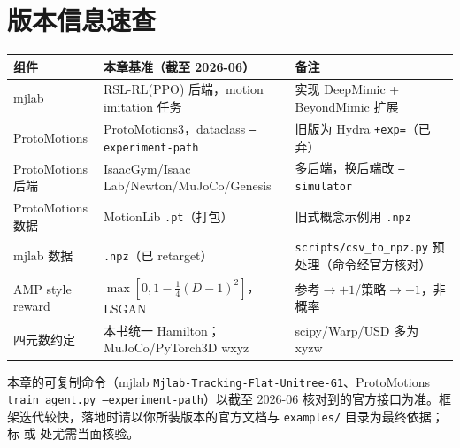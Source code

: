 \section*{版本信息速查}
\label{sec:rlmc-imit-versions}

\begin{center}
\small
\begin{tabular}{@{}lll@{}}
\toprule
组件 & 本章基准（截至 2026-06） & 备注 \\
\midrule
mjlab & RSL-RL(PPO) 后端，motion imitation 任务 & 实现 DeepMimic + BeyondMimic 扩展 \\
ProtoMotions & ProtoMotions3，dataclass \texttt{--experiment-path} & 旧版为 Hydra \texttt{+exp=}（已弃） \\
ProtoMotions 后端 & IsaacGym/Isaac Lab/Newton/MuJoCo/Genesis & 多后端，换后端改 \texttt{--simulator} \\
ProtoMotions 数据 & MotionLib \texttt{.pt}（打包） & 旧式概念示例用 \texttt{.npz} \\
mjlab 数据 & \texttt{.npz}（已 retarget） & \texttt{scripts/\allowbreak csv\_to\_npz.\allowbreak py} 预处理（命令经官方核对） \\
AMP style reward & $\max[0,1-\tfrac14(D-1)^2]$，LSGAN & 参考$\to+1$/策略$\to-1$，非概率 \\
四元数约定 & 本书统一 Hamilton；MuJoCo/PyTorch3D wxyz & scipy/Warp/USD 多为 xyzw \\
\bottomrule
\end{tabular}
\end{center}

\begin{finenote}
本章的可复制命令（mjlab \texttt{Mjlab-Tracking-Flat-Unitree-G1}、ProtoMotions \texttt{train\_agent.\allowbreak py --experiment-path}）以截至 2026-06 核对到的官方接口为准。框架迭代较快，落地时请以你所装版本的官方文档与 \texttt{examples/} 目录为最终依据；标 \rebuilt{} 或  处尤需当面核验。
\end{finenote}
